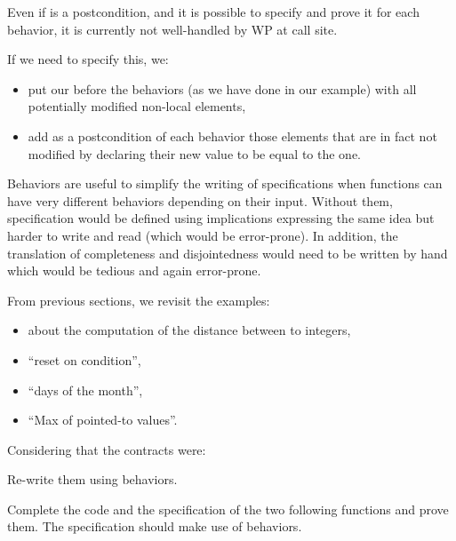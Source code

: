 \begin{Warning}
  Even if  is a postcondition, and it is possible to specify
  and prove it for each behavior, it is currently not well-handled by WP at call
  site.

  If we need to specify this, we:
  \begin{itemize}
  \item put our  before the behaviors (as we have done in our
    example) with all potentially modified non-local elements,
  \item add as a postcondition of each behavior those elements that are in fact
    not modified by declaring their new value to be equal to the
     one.
  \end{itemize}
\end{Warning}


Behaviors are useful to simplify the writing of specifications when
functions can have very different behaviors depending on their input.
Without them, specification would be defined using implications
expressing the same idea but harder to write and read (which would be
error-prone). In addition, the translation of completeness and
disjointedness would need to be written by hand which would be
tedious and again error-prone.






From previous sections, we revisit the examples:
\begin{itemize}
\item about the computation of the distance between to integers,
\item ``reset on condition'',
\item ``days of the month'',
\item ``Max of pointed-to values''.
\end{itemize}


Considering that the contracts were:




Re-write them using behaviors.






Complete the code and the specification of the two following functions
and prove them. The specification should make use of behaviors.


